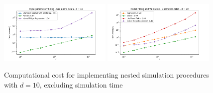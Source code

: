 \begin{figure}[ht!]
    \centering
    \includegraphics[width=0.48\textwidth]{./project1/figures/figure12a.png}
    \includegraphics[width=0.48\textwidth]{./project1/figures/figure12b.png}
    \caption{Computational cost for implementing nested simulation procedures with $d=10$, excluding simulation time}
\label{fig1:c_model}
\end{figure}

